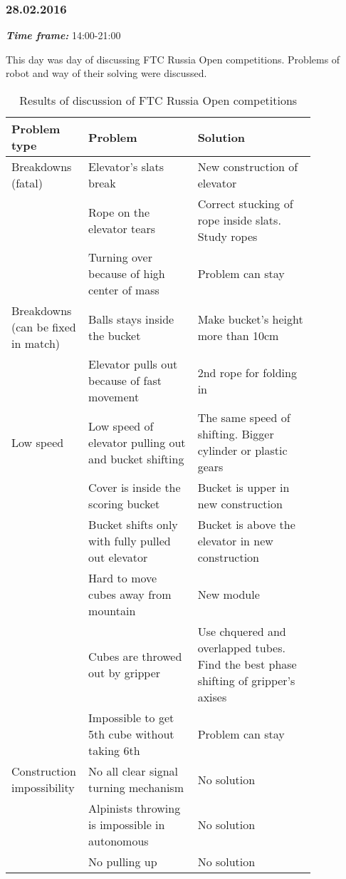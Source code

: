 \subsubsection{28.02.2016}
\textit{\textbf{Time frame:}} 14:00-21:00 

This day was day of discussing FTC Russia Open competitions. Problems of robot and way of their solving were discussed.

\begin{table}[H]
  \caption{Results of discussion of FTC Russia Open competitions}
  \label{tabular:meetingRUS28.02}
  \begin{center}
    \begin{tabular}{|p{0.12\linewidth}|p{0.35\linewidth}|p{0.38\linewidth}|}
 	  \hline
 	  Problem type & Problem & Solution \\
 	  \hline
 	  Breakdowns (fatal) & Elevator's slats break & New construction of elevator \\
 	  \hline
 	  & Rope on the elevator tears & Correct stucking of rope inside slats. Study ropes \\
      \hline
      & Turning over because of high center of mass	& Problem can stay \\
 	  \hline
 	  Breakdowns (can be fixed in match) & Balls stays inside the bucket & Make bucket's height more than 10cm \\
 	  \hline
 	  & Elevator pulls out because of fast movement	& 2nd rope for folding in \\
 	  \hline
 	  Low speed & Low speed of elevator pulling out and bucket shifting	& The same speed of shifting. Bigger cylinder or plastic gears \\
 	  \hline
 	  & Cover is inside the scoring bucket & Bucket is upper in new construction \\
 	  \hline
 	  & Bucket shifts only with fully pulled out elevator	& Bucket is above the elevator in new construction \\
 	  \hline
 	  & Hard to move cubes away from mountain & New module \\
 	  \hline
 	  & Cubes are throwed out by gripper & Use chquered and overlapped tubes. Find the best phase shifting of gripper's axises \\
 	  \hline
 	  & Impossible to get 5th cube without taking 6th & Problem can stay \\
 	  \hline
 	  Construction impossibility & No all clear signal turning mechanism & No solution\\	
 	  \hline
 	  & Alpinists throwing is impossible in autonomous & No solution \\
 	  \hline
 	  & No pulling up	& No solution\\
 	  \hline
    \end{tabular}
  \end{center}
\end{table}  
